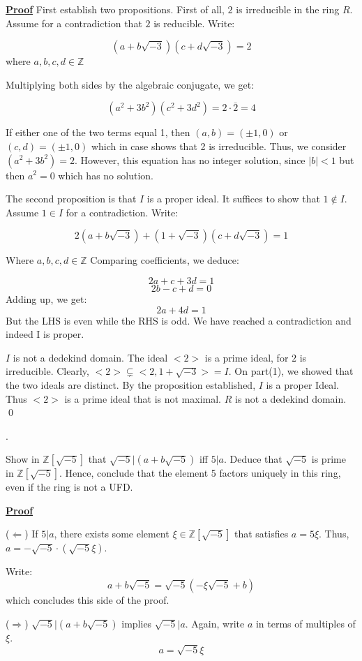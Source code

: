 \documentclass{article}
\newcounter{problemcnt}
\newcommand{\Problem}{{
    \vspace{5mm}
    \stepcounter{problemcnt}
    \noindent
    \arabic{problemcnt}. 
}
}
\newcommand{\Proof}{{
    \vspace{2mm}
    \noindent
    \textbf{
    \underline{Proof}}
}
}
\begin{document}
\Proof First establish two propositions. 
First of all, $2$ is irreducible in the 
ring $R$. Assume for a contradiction that 
$2$ is reducible. Write:

\[
    (a + b\sqrt{-3}) 
    (c + d\sqrt{-3})
    = 2
\]
where $a, b, c, d \in \mathbb{Z}$

Multiplying both sides by the algebraic 
conjugate, we get:

\[
    (a^2+3b^2)(c^2+3d^2) = 2 \cdot
    \bar{2} = 4
\]

If either one of the two terms equal 1, 
then $(a, b) = (\pm1, 0)$ 
or $(c, d) = (\pm1, 0)$
which in case shows that 2 is irreducible. 
Thus, we consider 
$(a^2+3b^2) = 2$. 
However, this equation has no integer solution,
since $|b| < 1$ but then $a^2 = 0$ which has 
no solution. 

The second proposition is that $I$ is 
a proper ideal. It suffices to show 
that $1 \notin I$. Assume $1 \in I$ 
for a contradiction. Write:

\[
    2(a+b\sqrt{-3})+(1+\sqrt{-3})
    (c+d\sqrt{-3}) = 1
\]

Where $a, b, c, d \in \mathbb{Z}$
Comparing coefficients, we deduce:

\[
    2a+c+3d = 1
\]
\[
    2b-c+d = 0
\]
Adding up, we get:
\[
    2a+4d = 1
\]
But the LHS is even while the RHS is odd. We 
have reached a contradiction and indeed I is proper. 

$I$ is not a dedekind domain. The ideal 
$<2>$ is a prime ideal, for $2$ is irreducible. 
Clearly, $<2> \subsetneq <2, 1+\sqrt{-3}> = I$. 
On part(1), we showed that the two ideals are 
distinct. By the proposition established, $I$ 
is a proper Ideal. Thus $<2>$ is a prime ideal 
that is not maximal. $R$ is not a dedekind domain. 
\qed



\Problem
Show in $\mathbb{Z}[\sqrt{-5}]$ that 
$\sqrt{-5}|(a+b\sqrt{-5})$ iff $5|a$. 
Deduce that $\sqrt{-5}$ is prime in 
$\mathbb{Z}[\sqrt{-5}]$. Hence, conclude 
that the element 5 factors uniquely in this 
ring, even if the ring is not a UFD. 

\Proof
($\Leftarrow$) If $5|a$, there exists some 
element $\xi \in \mathbb{Z}[\sqrt{-5}]$
that satisfies $a = 5\xi$. Thus, 
$a = -\sqrt{-5}\cdot (\sqrt{-5}\xi)$. 

Write:
\[
    a + b\sqrt{-5} = 
    \sqrt{-5}
    (-\xi\sqrt{-5} + b)
\]
which concludes this side of the proof. 

($\Rightarrow$) 
$\sqrt{-5}|(a+b\sqrt{-5})$ implies
$\sqrt{-5}|a$. Again, write $a$ in terms 
of multiples of $\xi$. 
\[
    a = \sqrt{-5}\xi
\]
\end{document}
